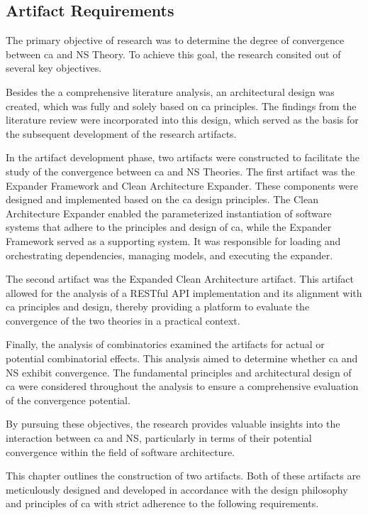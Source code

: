 \subsection{Artifact Requirements} \label{sec_artifact_requirements}

The primary objective of  research was to
determine the degree of convergence between \gls{ca} and NS Theory. To achieve this goal,
the research consited out of several key objectives.

Besides the a comprehensive literature analysis, an architectural design was created,
which was fully and solely based on \gls{ca} principles. The findings from the literature
review were incorporated into this design, which served as the basis for the subsequent
development of the research artifacts.

In the artifact development phase, two artifacts were constructed to facilitate the study
of the convergence between \gls{ca} and NS Theories. The first artifact was the Expander
Framework and Clean Architecture Expander. These components were designed and implemented
based on the \gls{ca} design principles. The Clean Architecture Expander enabled the
parameterized instantiation of software systems that adhere to the principles and design
of \gls{ca}, while the Expander Framework served as a supporting system. It was responsible for
loading and orchestrating dependencies, managing models, and executing the expander.

The second artifact was the Expanded Clean Architecture artifact. This artifact allowed
for the analysis of a RESTful API implementation and its alignment with \gls{ca}
principles and design, thereby providing a platform to evaluate the convergence of the two
theories in a practical context.

Finally, the analysis of combinatorics examined the artifacts for actual or potential
combinatorial effects. This analysis aimed to determine whether \gls{ca} and NS exhibit
convergence. The fundamental principles and architectural design of \gls{ca} were
considered throughout the analysis to ensure a comprehensive evaluation of the convergence
potential.

By pursuing these objectives, the research provides valuable insights into the interaction
between \gls{ca} and NS, particularly in terms of their potential convergence within the field
of software architecture.

This chapter outlines the construction of two artifacts. Both of these artifacts are
meticulously designed and developed in accordance with the design philosophy and
principles of \gls{ca} with strict adherence to the following requirements.





